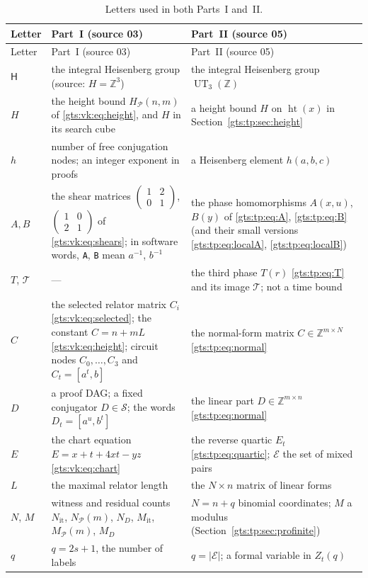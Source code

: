 \documentclass[11pt,letterpaper]{article}
\theoremstyle{definition}
\theoremstyle{remark}
\newcommand{\Z}{\mathbb Z}
\newcommand{\Pp}{\mathcal P}
\newcommand{\San}{\mathcal S}
\newcommand{\smallmat}[4]{\begin{pmatrix}#1&#2\\#3&#4\end{pmatrix}}
\newcommand{\HH}{\mathsf H}
\newcommand{\calT}{\mathcal T}
\newcommand{\htn}{\operatorname{ht}}
\begin{document}
\begin{center}
\small
\begin{longtable}{@{}p{}p{}p{}@{}}
\caption{Letters used in both Parts~I and~II.}\label{gts:tab:notation}\\
\toprule
Letter & Part~I (source 03) & Part~II (source 05)\\
\midrule
\endfirsthead
\toprule
Letter & Part~I (source 03) & Part~II (source 05)\\
\midrule
\endhead
$\HH$ & the integral Heisenberg group (source: $H=\Z^3$) & the integral Heisenberg group $\operatorname{UT}_3(\Z)$\\
$H$ & the height bound $H_{\Pp}(n,m)$ of \eqref{gts:vk:eq:height}, and $H$ in its search cube & a height bound $H$ on $\htn(x)$ in Section~\ref{gts:tp:sec:height}\\
$h$ & number of free conjugation nodes; an integer exponent in proofs & a Heisenberg element $h(a,b,c)$\\
$A,B$ & the shear matrices $\smallmat1201$, $\smallmat1021$ of \eqref{gts:vk:eq:shears}; in software words, \texttt{A}, \texttt{B} mean $a^{-1}$, $b^{-1}$ & the phase homomorphisms $A(x,u)$, $B(y)$ of \eqref{gts:tp:eq:A}, \eqref{gts:tp:eq:B} (and their small versions \eqref{gts:tp:eq:localA}, \eqref{gts:tp:eq:localB})\\
$T$, $\calT$ & --- & the third phase $T(r)$ \eqref{gts:tp:eq:T} and its image $\calT$; not a time bound\\
$C$ & the selected relator matrix $C_i$ \eqref{gts:vk:eq:selected}; the constant $C=n+mL$ \eqref{gts:vk:eq:height}; circuit nodes $C_0,\ldots,C_3$ and $C_t=[a^t,b]$ & the normal-form matrix $C\in\Z^{m\times N}$ \eqref{gts:tp:eq:normal}\\
$D$ & a proof DAG; a fixed conjugator $D\in\San$; the words $D_t=[a^u,b^t]$ & the linear part $D\in\Z^{m\times n}$ \eqref{gts:tp:eq:normal}\\
$E$ & the chart equation $E=x+t+4xt-yz$ \eqref{gts:vk:eq:chart} & the reverse quartic $E_t$ \eqref{gts:tp:eq:quartic}; $\mathcal E$ the set of mixed pairs\\
$L$ & the maximal relator length & the $N\times n$ matrix of linear forms\\
$N$, $M$ & witness and residual counts $N_{\mathrm{it}}$, $N_{\Pp}(m)$, $N_D$, $M_{\mathrm{it}}$, $M_{\Pp}(m)$, $M_D$ & $N=n+q$ binomial coordinates; $M$ a modulus (Section~\ref{gts:tp:sec:profinite})\\
$q$ & $q=2s+1$, the number of labels & $q=|\mathcal E|$; a formal variable in $Z_t(q)$\\

\end{longtable}
\end{center}
\end{document}
